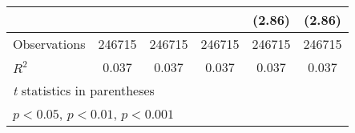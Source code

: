 {\begin{tabular}{l*{5}{c}}
                &                  &                  &                  &   (2.86)         &   (2.86)         \\
\hline
Observations    &   246715         &   246715         &   246715         &   246715         &   246715         \\
\(R^{2}\)       &    0.037         &    0.037         &    0.037         &    0.037         &    0.037         \\
\hline\hline
\multicolumn{6}{l}{\footnotesize \textit{t} statistics in parentheses}\\
\multicolumn{6}{l}{\footnotesize \sym{*} \(p<0.05\), \sym{**} \(p<0.01\), \sym{***} \(p<0.001\)}\\
\end{tabular}
}
